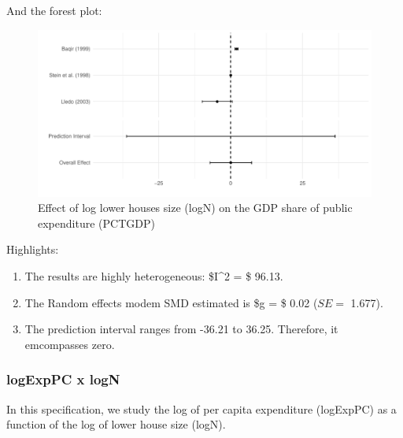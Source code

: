 \documentclass[
]{article}
\newenvironment{Shaded}{\begin{snugshade}}{\end{snugshade}}
\newcommand{\CommentTok}[1]{\textcolor[rgb]{0.56,0.35,0.01}{\textit{#1}}}
\newcommand{\DataTypeTok}[1]{\textcolor[rgb]{0.13,0.29,0.53}{#1}}
\newcommand{\KeywordTok}[1]{\textcolor[rgb]{0.13,0.29,0.53}{\textbf{#1}}}
\newcommand{\NormalTok}[1]{#1}
\newcommand{\OperatorTok}[1]{\textcolor[rgb]{0.81,0.36,0.00}{\textbf{#1}}}
\newcommand{\OtherTok}[1]{\textcolor[rgb]{0.56,0.35,0.01}{#1}}
\newcommand{\StringTok}[1]{\textcolor[rgb]{0.31,0.60,0.02}{#1}}
\providecommand{\tightlist}{%
  \setlength{\itemsep}{0pt}\setlength{\parskip}{0pt}}
\begin{document}
And the forest plot:

\begin{figure}
\centering
\includegraphics{appendixV5_files/figure-latex/unnamed-chunk-23-1.pdf}
\caption{Effect of log lower houses size (logN) on the GDP share of
public expenditure (PCTGDP)}
\end{figure}

Highlights:

\begin{enumerate}
\def\labelenumi{\arabic{enumi}.}
\tightlist
\item
  The results are highly heterogeneous: \$I\^{}2 = \$ 96.13.
\item
  The Random effects modem SMD estimated is \$g = \$ 0.02 (\(SE =\)
  1.677).
\item
  The prediction interval ranges from -36.21 to 36.25. Therefore, it
  emcompasses zero.
\end{enumerate}

\newpage

\hypertarget{logexppc-x-logn}{%
\subsubsection{logExpPC x logN}\label{logexppc-x-logn}}

In this specification, we study the log of per capita expenditure
(logExpPC) as a function of the log of lower house size (logN).

\begin{Shaded}
\end{Shaded}
\end{document}
